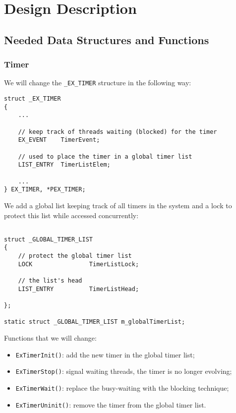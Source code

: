 \section{Design Description}

\subsection{Needed Data Structures and Functions}

\subsubsection{Timer}
\label{subsubsec:timer-data-structures}

We will change the \lstinline|_EX_TIMER| structure in the following way:

\begin{lstlisting}
struct _EX_TIMER
{
    ...
    
    // keep track of threads waiting (blocked) for the timer
    EX_EVENT    TimerEvent;    

    // used to place the timer in a global timer list
    LIST_ENTRY  TimerListElem; 
    
    ...
} EX_TIMER, *PEX_TIMER;
\end{lstlisting}

We add a global list keeping track of all timers in the system and a lock to protect this list while accessed concurrently:
\begin{lstlisting}

struct _GLOBAL_TIMER_LIST
{
    // protect the global timer list
    LOCK                TimerListLock;

    // the list's head
    LIST_ENTRY          TimerListHead;

}; 

static struct _GLOBAL_TIMER_LIST m_globalTimerList;    
\end{lstlisting}

Functions that we will change:
\begin{itemize}
    \item \lstinline|ExTimerInit()|: add the new timer in the global timer list;
    \item \lstinline|ExTimerStop()|: signal waiting threads, the timer is no longer evolving;
    \item \lstinline|ExTimerWait()|: replace the busy-waiting with the blocking technique;
    \item \lstinline|ExTimerUninit()|: remove the timer from the global timer list.
\end{itemize}

